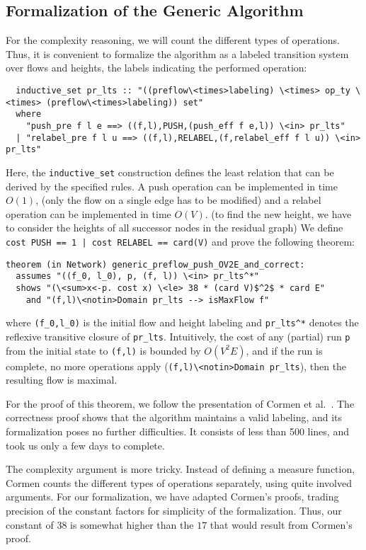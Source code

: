 \documentclass[smallcondensed]{svjour3}     %
\newcommand{\isai}{\lstinline[language=isabelle,basicstyle=\normalsize\ttfamily\slshape]}
\begin{document}
\subsection{Formalization of the Generic Algorithm}
For the complexity reasoning, we will count the different types of operations. Thus, it is convenient to formalize the algorithm as a labeled transition system
over flows and heights, the labels indicating the performed operation:
\begin{lstlisting}
  inductive_set pr_lts :: "((preflow\<times>labeling) \<times> op_ty \<times> (preflow\<times>labeling)) set" 
  where
    "push_pre f l e ==> ((f,l),PUSH,(push_eff f e,l)) \<in> pr_lts"
  | "relabel_pre f l u ==> ((f,l),RELABEL,(f,relabel_eff f l u)) \<in> pr_lts"
\end{lstlisting}  
Here, the \isai{inductive_set} construction defines the least relation that can be derived by the specified rules. 
A push operation can be implemented in time $O(1)$, (only the flow on a single edge has to be modified) and a relabel operation can be implemented in time $O(V)$.
(to find the new height, we have to consider the heights of all successor nodes in the residual graph) We define 
\isai{cost PUSH == 1 | cost RELABEL == card(V)} and prove the following theorem:
\begin{lstlisting}
theorem (in Network) generic_preflow_push_OV2E_and_correct:
  assumes "((f_0, l_0), p, (f, l)) \<in> pr_lts^*" 
  shows "(\<sum>x<-p. cost x) \<le> 38 * (card V)$^2$ * card E"
    and "(f,l)\<notin>Domain pr_lts --> isMaxFlow f"
\end{lstlisting}  
where \isai$(f_0,l_0)$ is the initial flow and height labeling and \isai{pr_lts^*} denotes the reflexive transitive closure of \isai{pr_lts}. 
Intuitively, the cost of any (partial) run \isai$p$ from the initial state to \isai$(f,l)$ is bounded by $O(V^2E)$, and if the 
run is complete, \ie no more operations apply (\isai$(f,l)\<notin>Domain pr_lts$), then the resulting flow is maximal. 

For the proof of this theorem, we follow the presentation of Cormen et al.~\cite{CLRS09}.
The correctness proof shows that the algorithm maintains a valid labeling, and its formalization poses no further difficulties. 
It consists of less than 500 lines, and took us only a few days to complete.

The complexity argument is more tricky. Instead of defining a measure function,
Cormen counts the different types of operations separately, using quite involved arguments.
For our formalization, we have adapted Cormen's proofs, trading precision of the constant factors for simplicity of the formalization. 
Thus, our constant of $38$ is somewhat higher than the $17$ that would result from Cormen's proof.
\end{document}
